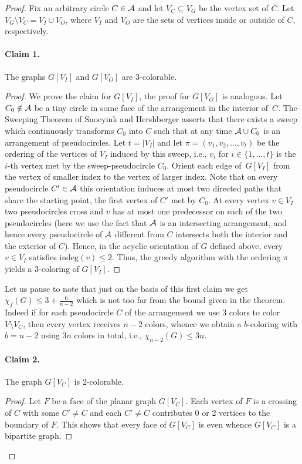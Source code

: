 \documentclass[fontsize=11pt,a4paper,DIV12]{scrartcl}
\def\AA{{\cal A}}
\def\indeg{\textrm{indeg}}
\begin{document}
\begin{proof}
  Fix an arbitrary circle $C \in \AA$ and let $V_C \subseteq V_G$ be the
  vertex set of $C$. Let $V_G\setminus V_C=V_I \cup V_O$, where $V_I$ and
  $V_O$ are the sets of vertices inside or outside of $C$, respectively.

\paragraph{Claim 1.}
The graphs $G[V_I]$ and $G[V_O]$ are $3$-colorable.
\begin{proof}
  We prove the claim for $G[V_I]$, the proof for $G[V_O]$ is analogous.  Let
  $C_0 \notin \AA$ be a tiny circle in some face of the arrangement in the
  interior of~$C$. The Sweeping Theorem of Snoeyink and Hershberger
  \cite[Theorem~3.1]{SnoeyinkHershberger1991} asserts that there exists a
  sweep which continuously transforms $C_0$ into $C$ such that at any time
  $\AA\cup C_0$ is an arrangement of pseudocircles.  Let $t = |V_I|$ and let
  $\pi=(v_1,v_2,\ldots,v_{t})$ be the ordering of the vertices of $V_I$
  induced by this sweep, i.e., $v_i$ for $i \in \{1,\ldots,t\}$ is the $i$-th
  vertex met by the sweep-pseudocircle $C_0$. Orient each edge of~$G[V_I]$ from the
  vertex of smaller index to the vertex of larger index. Note that on every
  pseudocircle $C'\in \AA$ this orientation induces at most two directed paths that
  share the starting point, the first vertex of $C'$ met by $C_0$.
  At every vertex $v \in V_I$ two pseudocircles cross and $v$ has at
  most one predecessor on each of the two pseudocircles (here we use the fact that
  $\AA$ is an intersecting arrangement, and hence every pseudocircle of $\AA$
  different from $C$ intersects both the interior and the exterior of
  $C$). Hence, in the acyclic orientation of $G$ defined above, every
  $v \in V_I$ satisfies $\indeg(v) \leq 2$. Thus, the greedy algorithm
  with the ordering $\pi$ yields a $3$-coloring of $G[V_I]$.
\end{proof}

Let us pause to note that just on the basis of this first claim we get
$\chi_f (G)\le 3+\frac{6}{n-2}$ which is not too far from the bound given in the
theorem. Indeed if for each pseudocircle $C$ of the arrangement we use 3 colors to
color $V\setminus V_C$, then every vertex receives $n-2$ colors, whence we
obtain a $b$-coloring with $b=n-2$ using $3n$ colors in total, i.e.,
$\chi_{n-2} (G)\le 3n$.

\paragraph{Claim 2.}
The graph $G[V_C]$ is $2$-colorable.
\begin{proof}
  Let $F$ be a face of the planar graph $G[V_C]$. Each vertex of $F$ is a
  crossing of $C$ with some $C'\neq C$ and each $C'\neq C$ contributes 0 or 2
  vertices to the boundary of $F$. This shows that every face of $G[V_C]$ is
  even whence $G[V_C]$ is a bipartite graph.
\end{proof}


\end{proof}
\end{document}

